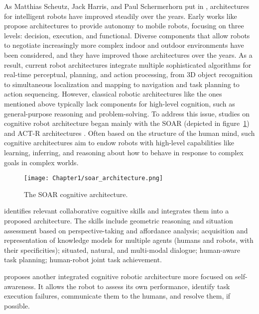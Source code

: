 As Matthias Scheutz, Jack Harris, and Paul Schermerhorn put in \cite{scheutz_systematic_2013}, architectures for intelligent robots have improved steadily over the years. 
Early works like \cite{alami_designing_1993,alami_architecture_1998,chatila_integrated_1992} propose architectures to provide autonomy to mobile robots, focusing on three levels: decision, execution, and functional. Diverse components that allow robots to negotiate increasingly more complex indoor and outdoor environments have been considered, and they have improved those architectures over the years. As a result, current robot architectures integrate multiple sophisticated algorithms for real-time perceptual, planning, and action processing, from 3D object recognition to simultaneous localization and mapping to navigation and task planning to action sequencing. However, classical robotic architectures like the ones mentioned above typically lack components for high-level cognition, such as general-purpose reasoning and problem-solving. 
To address this issue, studies on cognitive robot architecture began mainly with the SOAR (depicted in figure~\ref{fig:soar}) and ACT-R architectures \cite{laird_soar_1987,anderson2004integrated}.
Often based on the structure of the human mind, such cognitive architectures aim to endow robots with high-level capabilities like learning, inferring, and reasoning about how to behave in response to complex goals in complex worlds. 

\begin{figure}[h]
    \center
    \texttt{[image: Chapter1/soar\_architecture.png]}
    \caption{The SOAR cognitive architecture.}
    \label{fig:soar}
\end{figure}

\cite{lemaignan_artificial_2017} identifies relevant collaborative cognitive skills and integrates them into a proposed architecture. The skills include geometric reasoning and situation assessment based on perspective-taking and affordance analysis; acquisition and representation of knowledge models for multiple agents (humans and robots, with their specificities); situated, natural, and multi-modal dialogue; human-aware task planning; human-robot joint task achievement.

\cite{thierauf_toward_2024} proposes another integrated cognitive robotic architecture more focused on self-awareness. It allows the robot to assess its own performance, identify task execution failures, communicate them to the humans, and resolve them, if possible. 



